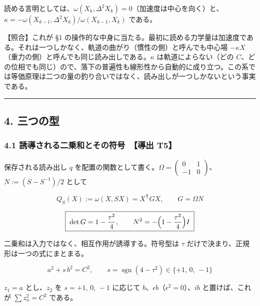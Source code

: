 \documentclass[
  a4paper,
]{ltjsarticle}
\begin{document}
読める言明としては、\(\omega(X_k,\Delta^2X_k)=0\)（加速度は中心を向く）と、\(\kappa=-\omega(X_{k-1},\Delta^2X_k)/\omega(X_{k-1},X_k)\)
である。

【照合】これが §1
の操作的な中身に当たる。最初に読める力学量は加速度である。それは一つしかなく、軌道の曲がり（慣性の側）と呼んでも中心場
\(-\kappa X\)（重力の側）と呼んでも同じ読み出しである。\(\kappa\)
は軌道によらない（どの
\(C\)、どの位相でも同じ）ので、落下の普遍性も線形性から自動的に成り立つ。この系では等価原理は二つの量の釣り合いではなく、読み出しが一つしかないという事実である。

\begin{center}\rule{0.5\linewidth}{0.5pt}\end{center}

\subsection{4. 三つの型}\label{ux4e09ux3064ux306eux578b}

\subsubsection{4.1 誘導される二乗和とその符号　【導出
T5】}\label{ux8a98ux5c0eux3055ux308cux308bux4e8cux4e57ux548cux3068ux305dux306eux7b26ux53f7-ux5c0eux51fa-t5}

保存される読み出し \(q\)
を配置の関数として書く。\(\Omega=\begin{pmatrix}0&1\\-1&0\end{pmatrix}\)、\(N:=(S-S^{-1})/2\)
として

\[
Q_S(X):=\omega(X,SX)=X^{\mathsf T}GX,\qquad G=\Omega N
\]

\[
\boxed{\;\det G=1-\frac{\tau^2}{4},\qquad N^2=-\Bigl(1-\frac{\tau^2}{4}\Bigr)I\;}
\]

二乗和は入力ではなく、相互作用が誘導する。符号型は \(\tau\)
だけで決まり、正規形は一つの式にまとまる。

\[
\boxed{\;a^2+s\,b^2=C^2,\qquad s=\operatorname{sgn}(4-\tau^2)\in\{+1,\,0,\,-1\}\;}
\]

\(z_1=a\) とし、\(z_2\) を \(s=+1,\,0,\,-1\) に応じて
\(b\)、\(\epsilon b\)（\(\epsilon^2=0\)）、\(ib\) と置けば、これが
\(\sum z_n^2=C^2\) である。
\end{document}

